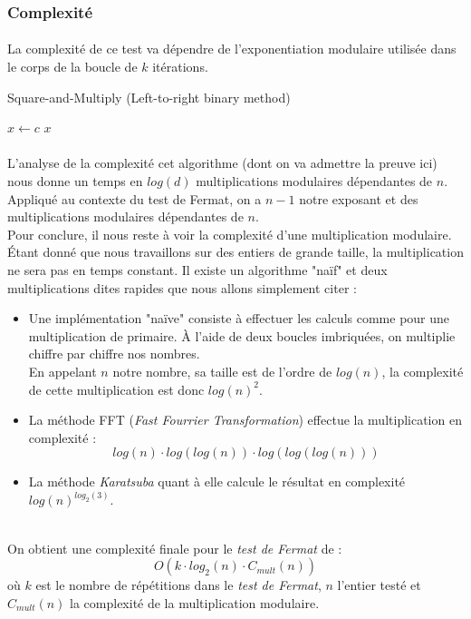 		
	\subsubsection{Complexité}
		\paragraph{}La complexité de ce test va dépendre de l'exponentiation modulaire utilisée dans le corps de la boucle de $k$ itérations.\\
		
		\begin{algorithm}[H]
			\caption{Square-and-Multiply (Left-to-right binary method)}\label{SqM}
			$x \gets c$\;
		\Retour $x$\;
		\end{algorithm}
		
		\paragraph{}L'analyse de la complexité cet algorithme (dont on va admettre la preuve ici) nous donne un temps en $log(d)$ multiplications modulaires dépendantes de $n$.\\
		\indent Appliqué au contexte du test de Fermat, on a $n-1$ notre exposant et des multiplications modulaires dépendantes de $n$.\\
		\indent Pour conclure, il nous reste à voir la complexité d'une multiplication modulaire. Étant donné que nous travaillons sur des entiers de grande taille, la multiplication ne sera pas en temps constant. Il existe un algorithme "naïf" et deux multiplications dites rapides que nous allons simplement citer :
			\begin{itemize}
			\item
			Une implémentation "naïve" consiste à effectuer les calculs comme pour une multiplication de primaire. À l'aide de deux boucles imbriquées, on multiplie chiffre par chiffre nos nombres.\\
			En appelant $n$ notre nombre, sa taille est de l'ordre de $log(n)$, la complexité de cette multiplication est donc $log(n)^{2}$.
			\item
			La méthode FFT (\textit{Fast Fourrier Transformation}) effectue la multiplication en complexité :
			$$log(n) \cdot log(log(n)) \cdot log(log(log(n)))$$
			\item
			La méthode \textit{Karatsuba} quant à elle calcule le résultat en complexité $log(n)^{log_{2}(3)}$.
			\end{itemize}~\\
		On obtient une complexité finale pour le \textit{test de Fermat} de :
		\[O(k \cdot log_{2}(n) \cdot C_{mult}(n))\]
		où $k$ est le nombre de répétitions dans le \textit{test de Fermat}, $n$ l'entier testé et $C_{mult}(n)$ la complexité de la multiplication modulaire.
	
